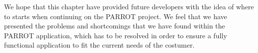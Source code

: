 We hope that this chapter have provided future developers with the idea of where to starts when continuing on the PARROT project. 
We feel that we have presented the problems and shortcomings that we have found within the PARROT application, which has to be resolved in order to ensure a fully functional application to fit the current needs of the costumer.\\
